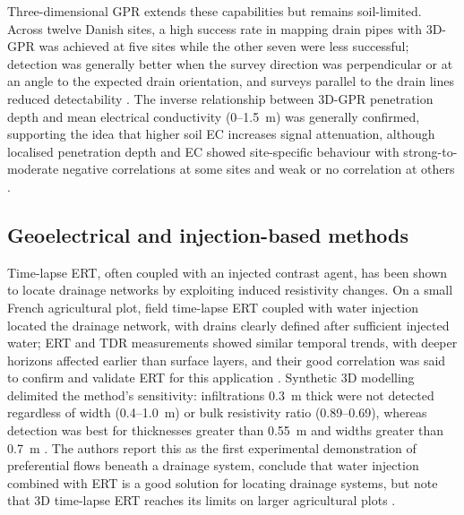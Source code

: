 \documentclass[11pt]{article}
\begin{document}
Three-dimensional GPR extends these capabilities but remains soil-limited. Across twelve Danish sites, a high success rate in mapping drain pipes with 3D-GPR was achieved at five sites while the other seven were less successful; detection was generally better when the survey direction was perpendicular or at an angle to the expected drain orientation, and surveys parallel to the drain lines reduced detectability \parencite{Koganti2020}. The inverse relationship between 3D-GPR penetration depth and mean electrical conductivity (0--1.5~m) was generally confirmed, supporting the idea that higher soil EC increases signal attenuation, although localised penetration depth and EC showed site-specific behaviour with strong-to-moderate negative correlations at some sites and weak or no correlation at others \parencite{Koganti2020}.

\subsection{Geoelectrical and injection-based methods}

Time-lapse ERT, often coupled with an injected contrast agent, has been shown to locate drainage networks by exploiting induced resistivity changes. On a small French agricultural plot, field time-lapse ERT coupled with water injection located the drainage network, with drains clearly defined after sufficient injected water; ERT and TDR measurements showed similar temporal trends, with deeper horizons affected earlier than surface layers, and their good correlation was said to confirm and validate ERT for this application \parencite{Jouen2018}. Synthetic 3D modelling delimited the method's sensitivity: infiltrations 0.3~m thick were not detected regardless of width (0.4--1.0~m) or bulk resistivity ratio (0.89--0.69), whereas detection was best for thicknesses greater than 0.55~m and widths greater than 0.7~m \parencite{Jouen2018}. The authors report this as the first experimental demonstration of preferential flows beneath a drainage system, conclude that water injection combined with ERT is a good solution for locating drainage systems, but note that 3D time-lapse ERT reaches its limits on larger agricultural plots \parencite{Jouen2018}.
\end{document}
